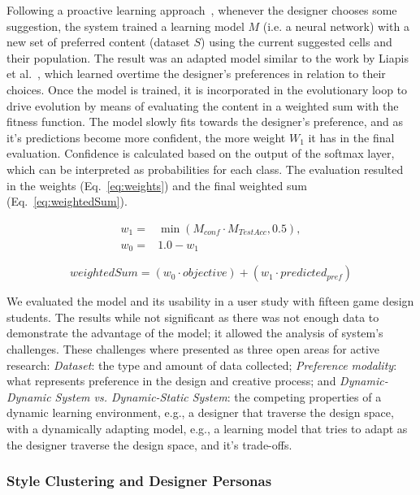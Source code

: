 Following a proactive learning approach~\cite{donmez2008proactive}, whenever the designer chooses some suggestion, the system trained a learning model $M$ (i.e. a neural network) with a new set of preferred content (dataset $S$) using the current suggested cells and their population. The result was an adapted model similar to the work by Liapis et al.~\cite{Liapis2012-adaptiveVisual}, which learned overtime the designer's preferences in relation to their choices. Once the model is trained, it is incorporated in the evolutionary loop to drive evolution by means of evaluating the content in a weighted sum with the fitness function. The model slowly fits towards the designer’s preference, and as it's predictions become more confident, the more weight $W_{1}$ it has in the final evaluation. Confidence is calculated based on the output of the softmax layer, which can be interpreted as probabilities for each class. The evaluation resulted in the weights (Eq.~\ref{eq:weights}) and the final weighted sum (Eq.~\ref{eq:weightedSum}).

\begin{equation} \label{eq:weights}
\begin{split}
 w_{1}={}&\min(M_{conf} \cdot M_{TestAcc}, 0.5),\\
w_{0} ={}& 1.0 - w_{1}   
\end{split}
\end{equation}

\begin{equation} \label{eq:weightedSum}
weightedSum = (w_{0} \cdot objective) + (w_{1} \cdot predicted_{pref})
\end{equation}

We evaluated the model and its usability in a user study with fifteen game design students. The results while not significant as there was not enough data to demonstrate the advantage of the model; it allowed the analysis of system's challenges. These challenges where presented as three open areas for active research: \textit{Dataset}: the type and amount of data collected; \textit{Preference modality}: what represents preference in the design and creative process; and \textit{Dynamic-Dynamic System vs. Dynamic-Static System}: the competing properties of a dynamic learning environment, e.g., a designer that traverse the design space, with a dynamically adapting model, e.g., a learning model that tries to adapt as the designer traverse the design space, and it's trade-offs.

\subsubsection{Style Clustering and Designer Personas}

